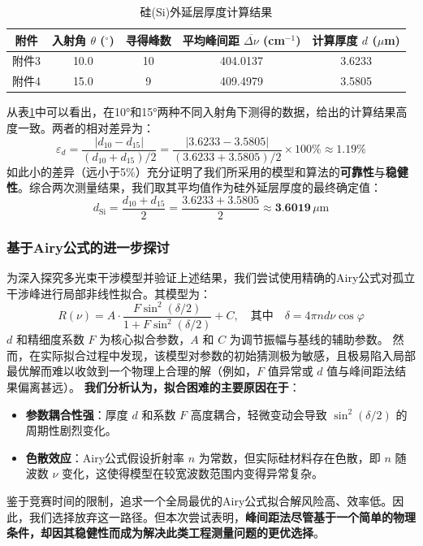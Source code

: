 \documentclass[withoutpreface,bwprint]{cumcmthesis} %
\begin{document}
\begin{table}[htbp]
    \centering
    \caption{硅(Si)外延层厚度计算结果}
    \label{tab:si_thickness_results}
    \begin{tabular}{ccccc}
        \toprule
        附件  & 入射角 $\theta$ ($^\circ$) & 寻得峰数 & 平均峰间距 $\overline{\Delta\nu}$ (cm$^{-1}$) & 计算厚度 $d$ ($\mu$m) \\
        \midrule
        附件3 & 10.0                    & 10   & 404.0137                                 & 3.6233            \\
        附件4 & 15.0                    & 9    & 409.4979                                 & 3.5805            \\
        \bottomrule
    \end{tabular}
\end{table}

从表\ref{tab:si_thickness_results}中可以看出，在10°和15°两种不同入射角下测得的数据，给出的计算结果高度一致。两者的相对差异为：
$$
    \varepsilon_d = \frac{|d_{10} - d_{15}|}{(d_{10} + d_{15})/2} = \frac{|3.6233 - 3.5805|}{(3.6233 + 3.5805)/2} \times 100\% \approx 1.19\%
$$
如此小的差异（远小于5\%）充分证明了我们所采用的模型和算法的\textbf{可靠性}与\textbf{稳健性}。综合两次测量结果，我们取其平均值作为硅外延层厚度的最终确定值：
$$
    d_{\text{Si}} = \frac{d_{10} + d_{15}}{2} = \frac{3.6233 + 3.5805}{2} \approx \textbf{3.6019} \, \mu\text{m}
$$

\subsubsection{基于Airy公式的进一步探讨}
为深入探究多光束干涉模型并验证上述结果，我们尝试使用精确的Airy公式对孤立干涉峰进行局部非线性拟合。其模型为：
$$
    R(\nu) = A \cdot \frac{F \sin^2(\delta/2)}{1 + F \sin^2(\delta/2)} + C, \quad \text{其中} \quad \delta = 4\pi n d \nu \cos\varphi
$$
$d$ 和精细度系数 $F$ 为核心拟合参数，$A$ 和 $C$ 为调节振幅与基线的辅助参数。
然而，在实际拟合过程中发现，该模型对参数的初始猜测极为敏感，且极易陷入局部最优解而难以收敛到一个物理上合理的解（例如，$F$ 值异常或 $d$ 值与峰间距法结果偏离甚远）。
\textbf{我们分析认为，拟合困难的主要原因在于}：
\begin{itemize}
    \item \textbf{参数耦合性强}：厚度 $d$ 和系数 $F$ 高度耦合，轻微变动会导致 $\sin^2(\delta/2)$ 的周期性剧烈变化。
    \item \textbf{色散效应}：Airy公式假设折射率 $n$ 为常数，但实际硅材料存在色散，即 $n$ 随波数 $\nu$ 变化，这使得模型在较宽波数范围内变得异常复杂。
\end{itemize}
鉴于竞赛时间的限制，追求一个全局最优的Airy公式拟合解风险高、效率低。因此，我们选择放弃这一路径。但本次尝试表明，\textbf{峰间距法尽管基于一个简单的物理条件，却因其稳健性而成为解决此类工程测量问题的更优选择}。
\end{document}
